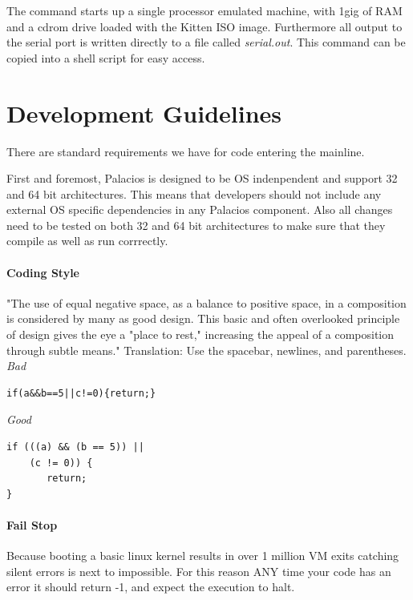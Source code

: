 \documentclass[11pt]{article}
\begin{document}
The command starts up a single processor emulated machine, with 1gig
of RAM and a cdrom drive loaded with the Kitten ISO image. Furthermore
all output to the serial port is written directly to a file called
{\em serial.out}. This command can be copied into a shell script for easy access.

\section{Development Guidelines}

There are standard requirements we have for code entering the mainline. 

First and foremost, Palacios is designed to be OS indenpendent and
support 32 and 64 bit architectures. This means that developers should
not include any external OS specific dependencies in any Palacios
component. Also all changes need to be tested on both 32 and 64 bit
architectures to make sure that they compile as well as run corrrectly.

\paragraph*{Coding Style}

"The use of equal negative space, as a balance to positive space, in a
composition is considered by many as good design. This basic and often
overlooked principle of design gives the eye a "place to rest,"
increasing the appeal of a composition through subtle means."
\newline\newline
Translation: Use the spacebar, newlines, and parentheses. 
\newline\newline
{\em Bad}
\begin{verbatim}
if(a&&b==5||c!=0){return;}
\end{verbatim}


{\em Good}

\begin{verbatim}
if (((a) && (b == 5)) || 
    (c != 0)) {
       return;
}
\end{verbatim}

\paragraph*{Fail Stop}
Because booting a basic linux kernel results in over 1 million VM exits
catching silent errors is next to impossible. For this reason
ANY time your code has an error it should return -1, and expect the
execution to halt. 
\end{document}
